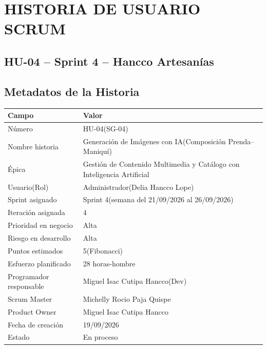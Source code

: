 \documentclass[12pt,a4paper]{article}
\begin{document}
\thispagestyle{fancy}

\section*{HISTORIA DE USUARIO SCRUM}

\subsection*{HU-04 -- Sprint 4 -- Hancco Artesanías}

\subsection*{Metadatos de la Historia}

\begin{center}
\small
\begin{tabularx}{\textwidth}{p{4.5cm} L}
\toprule
\textbf{Campo} & \textbf{Valor} \\
\midrule
Número & HU-04(SG-04) \\
Nombre historia & Generación de Imágenes con IA(Composición Prenda--Maniquí) \\
Épica & Gestión de Contenido Multimedia y Catálogo con Inteligencia Artificial \\
Usuario(Rol) & Administrador(Delia Hancco Lope) \\
Sprint asignado & Sprint 4(semana del 21/09/2026 al 26/09/2026) \\
Iteración asignada & 4 \\
Prioridad en negocio & Alta \\
Riesgo en desarrollo & Alta \\
Puntos estimados & 5(Fibonacci) \\
Esfuerzo planificado & 28 horas-hombre \\
Programador responsable & Miguel Isac Cutipa Hancco(Dev) \\
Scrum Master & Michelly Rocio Paja Quispe \\
Product Owner & Miguel Isac Cutipa Hancco \\
Fecha de creación & 19/09/2026 \\
Estado & En proceso \\
\bottomrule
\end{tabularx}
\end{center}
\end{document}
